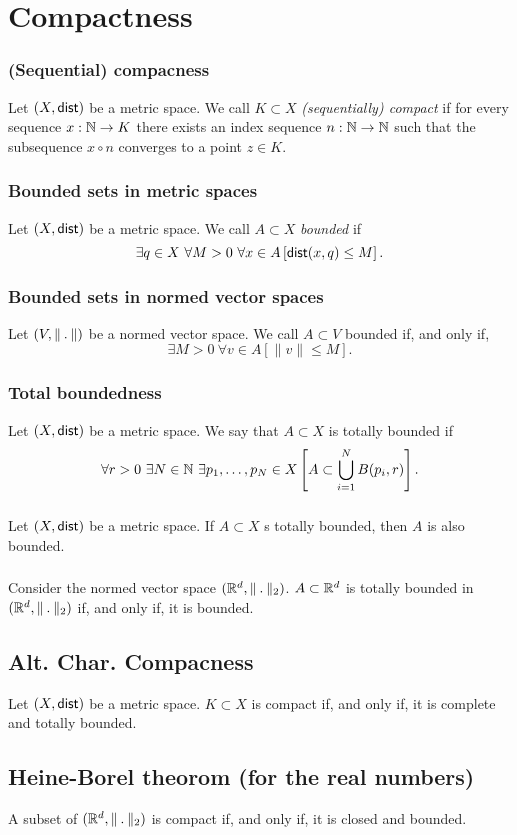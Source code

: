 \section{Compactness}

\subsubsection*{(Sequential) compacness}
\udef Let $(X, \mathsf{dist})$ be a metric space.
We call $K \subset X$ \emph{(sequentially) compact} if for every sequence
$x : \mathbb{N} \to K$ there exists an index sequence $n : \mathbb{N} \to \mathbb{N}$ such that
the subsequence $x \circ n$ converges to a point $z \in K$.

\subsubsection*{Bounded sets in metric spaces}
\udef Let $(X, \mathsf{dist})$ be a metric space. We call $A \subset X$ \emph{bounded} if
\[
    \exists q \in X\ \forall M > 0\ \forall x \in A
        \left[ \dist(x,q) \leq M \right].
\]

\subsubsection*{Bounded sets in normed vector spaces}
\uprop Let $(V, \norm)$ be a normed vector space. We call $A \subset V$ bounded if,
and only if,
\[
    \exists M > 0\ \forall v \in A \left[ \| v \| \leq M \right].
\]

\subsubsection*{Total boundedness}
\udef Let $(X, \mathsf{dist})$ be a metric space. We say that $A \subset X$ is totally
bounded if
\[
    \forall r > 0\ \exists N \in \N\ \exists p_1, \dots, p_N \in X
        \left[ A \subset \bigcup_{i=1}^{N} B(p_i, r) \right].
\]

\subsubsection*{}
\uprop Let $(X, \mathsf{dist})$ be a metric space. If $A \subset X$ s totally bounded,
then $A$ is also bounded.

\subsubsection*{}
\uprop Consider the normed vector space $(\R^d, \norm_2)$.
$A \subset \mathbb{R}^d$ is totally bounded in $(\R^d, \norm_2)$ if, and only if,
it is bounded.

\subsection{Alt. Char. Compacness}
\uthm Let $(X, \mathsf{dist})$ be a metric space. $K \subset X$ is compact if, and only if,
it is complete and totally bounded.

\subsection{Heine-Borel theorom (for the real numbers)}
A subset of $(\R^d, \norm_2)$ is compact if, and only if, it is closed and bounded.